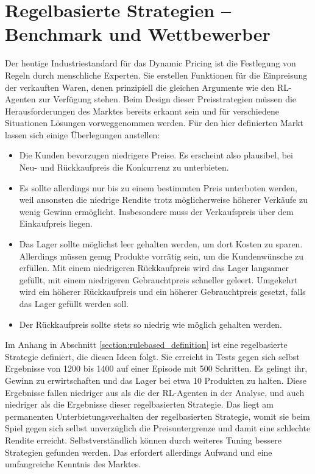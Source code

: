 \section{Regelbasierte Strategien -- Benchmark und Wettbewerber}
\label{section:rulebased}
Der heutige Industriestandard für das Dynamic Pricing ist die Festlegung von Regeln durch menschliche Experten.
Sie erstellen Funktionen für die Einpreisung der verkauften Waren, denen prinzipiell die gleichen Argumente wie den RL-Agenten zur Verfügung stehen.
Beim Design dieser Preisstrategien müssen die Herausforderungen des Marktes bereits erkannt sein und für verschiedene Situationen Lösungen vorweggenommen werden.
Für den hier definierten Markt lassen sich einige Überlegungen anstellen:
\begin{itemize}
	\item Die Kunden bevorzugen niedrigere Preise.
	Es erscheint also plausibel, bei Neu- und Rückkaufpreis die Konkurrenz zu unterbieten.
	\item Es sollte allerdings nur bis zu einem bestimmten Preis unterboten werden, weil ansonsten die niedrige Rendite trotz möglicherweise höherer Verkäufe zu wenig Gewinn ermöglicht.
	Insbesondere muss der Verkaufspreis über dem Einkaufpreis liegen.
	\item Das Lager sollte möglichst leer gehalten werden, um dort Kosten zu sparen.
	Allerdings müssen genug Produkte vorrätig sein, um die Kundenwünsche zu erfüllen.
	Mit einem niedrigeren Rückkaufpreis wird das Lager langsamer gefüllt, mit einem niedrigeren Gebrauchtpreis schneller geleert.
	Umgekehrt wird ein höherer Rückkaufpreis und ein höherer Gebrauchtpreis gesetzt, falls das Lager gefüllt werden soll.
	\item Der Rückkaufpreis sollte stets so niedrig wie möglich gehalten werden.
\end{itemize}
Im Anhang in Abschnitt \ref{section:rulebased_definition} ist eine regelbasierte Strategie definiert, die diesen Ideen folgt.
Sie erreicht in Tests gegen sich selbst Ergebnisse von 1200 bis 1400 auf einer Episode mit 500 Schritten.
Es gelingt ihr, Gewinn zu erwirtschaften und das Lager bei etwa 10 Produkten zu halten.
Diese Ergebnisse fallen niedriger aus als die der RL-Agenten in der Analyse, und auch niedriger als die Ergebnisse dieser regelbasierten Strategie.
Das liegt am permanenten Unterbietungsverhalten der regelbasierten Strategie, womit sie beim Spiel gegen sich selbst unverzüglich die Preisuntergrenze und damit eine schlechte Rendite erreicht.
Selbstverständlich können durch weiteres Tuning bessere Strategien gefunden werden.
Das erfordert allerdings Aufwand und eine umfangreiche Kenntnis des Marktes.